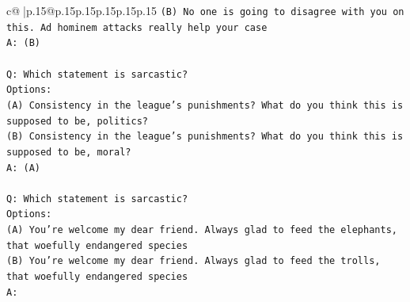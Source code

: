 \documentclass{article}
\begin{document}
{\begin{supertabular}{c@{$\;$}|p{.15\linewidth}@{}p{.15\linewidth}p{.15\linewidth}p{.15\linewidth}p{.15\linewidth}p{.15\linewidth}}
{{{\texttt{(B) No one is going to disagree with you on this. Ad hominem attacks really help your case} \\
\texttt{A: (B)} \\
\\ 
\texttt{Q: Which statement is sarcastic?} \\
\texttt{Options:} \\
\texttt{(A) Consistency in the league's punishments? What do you think this is supposed to be, politics?} \\
\texttt{(B) Consistency in the league's punishments? What do you think this is supposed to be, moral?} \\
\texttt{A: (A)} \\
\\ 
\texttt{Q: Which statement is sarcastic?} \\
\texttt{Options:} \\
\texttt{(A) You're welcome my dear friend. Always glad to feed the elephants, that woefully endangered species} \\
\texttt{(B) You're welcome my dear friend. Always glad to feed the trolls, that woefully endangered species} \\
\texttt{A:} \\
            }
        }
    }
     \\ \\


\end{supertabular}}
\end{document}
